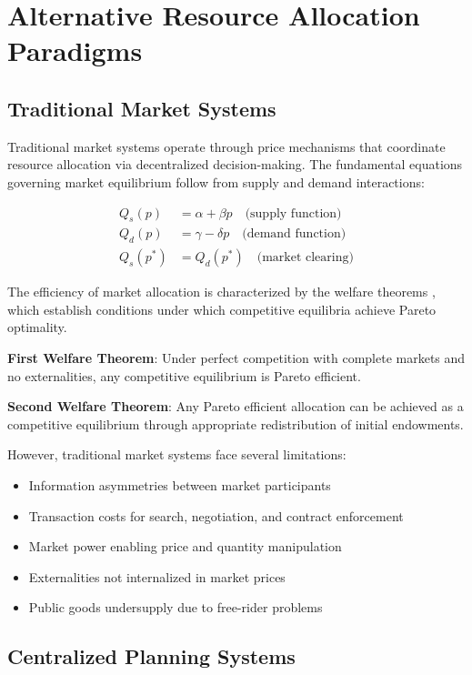 \documentclass[12pt,a4paper]{article}
\begin{document}
\section{Alternative Resource Allocation Paradigms}

\subsection{Traditional Market Systems}

Traditional market systems operate through price mechanisms that coordinate resource allocation via decentralized decision-making. The fundamental equations governing market equilibrium follow from supply and demand interactions:

\begin{align}
Q_s(p) &= \alpha + \beta p \quad \text{(supply function)} \\
Q_d(p) &= \gamma - \delta p \quad \text{(demand function)} \\
Q_s(p^*) &= Q_d(p^*) \quad \text{(market clearing)}
\end{align}

The efficiency of market allocation is characterized by the welfare theorems \cite{samuelson1947,debreu1959}, which establish conditions under which competitive equilibria achieve Pareto optimality.

\textbf{First Welfare Theorem}: Under perfect competition with complete markets and no externalities, any competitive equilibrium is Pareto efficient.

\textbf{Second Welfare Theorem}: Any Pareto efficient allocation can be achieved as a competitive equilibrium through appropriate redistribution of initial endowments.

However, traditional market systems face several limitations:
\begin{itemize}
\item Information asymmetries between market participants
\item Transaction costs for search, negotiation, and contract enforcement
\item Market power enabling price and quantity manipulation
\item Externalities not internalized in market prices
\item Public goods undersupply due to free-rider problems
\end{itemize}

\subsection{Centralized Planning Systems}
\end{document}
